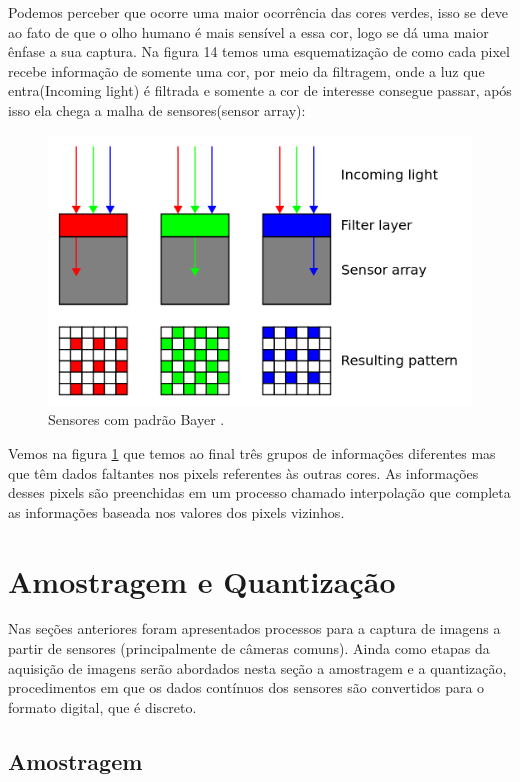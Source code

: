 \documentclass[
  brazilian,
]{book}
\begin{document}
Podemos perceber que ocorre uma maior ocorrência das cores verdes, isso se deve ao fato de que o olho humano é mais sensível a essa cor, logo se dá uma maior ênfase a sua captura. Na figura 14 temos uma esquematização de como cada pixel recebe informação de somente uma cor, por meio da filtragem, onde a luz que entra(Incoming light) é filtrada e somente a cor de interesse consegue passar, após isso ela chega a malha de sensores(sensor array):



\begin{figure}

{\centering \includegraphics[width=0.6\linewidth]{imagens/02-formacao/sensorarray} 

}

\caption{Sensores com padrão Bayer \autocite{img:sensorarray}.}\label{fig:sensorarray}
\end{figure}

Vemos na figura \ref{fig:sensorarray} que temos ao final três grupos de informações diferentes mas que têm dados faltantes nos pixels referentes às outras cores. As informações desses pixels são preenchidas em um processo chamado interpolação que completa as informações baseada nos valores dos pixels vizinhos.

\hypertarget{amostragem-e-quantizauxe7uxe3o}{%
\section{Amostragem e Quantização}\label{amostragem-e-quantizauxe7uxe3o}}

Nas seções anteriores foram apresentados processos para a captura de imagens a partir de sensores (principalmente de câmeras comuns). Ainda como etapas da aquisição de imagens serão abordados nesta seção a amostragem e a quantização, procedimentos em que os dados contínuos dos sensores são convertidos para o formato digital, que é discreto.

\hypertarget{amostragem}{%
\subsection{Amostragem}\label{amostragem}}
\end{document}
